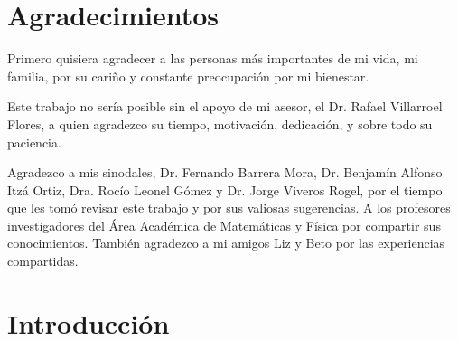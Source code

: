\documentclass[12pt]{book}
\theoremstyle{definition}
\newcounter{in}
\begin{document}

\chapter*{Agradecimientos}

Primero quisiera agradecer a las personas más importantes de mi vida,
mi familia, por su cariño y constante preocupación por mi bienestar.

Este trabajo no sería posible sin el apoyo de mi asesor, el
Dr. Rafael Villarroel Flores, a quien agradezco su
tiempo, motivación, dedicación, y sobre todo su paciencia.

Agradezco a mis sinodales, Dr. Fernando Barrera Mora, Dr. Benjamín
Alfonso Itzá Ortiz, Dra. Rocío Leonel Gómez y Dr. Jorge Viveros Rogel,
por el tiempo que les tomó revisar este trabajo y por sus valiosas
sugerencias. A los profesores investigadores del Área Académica de
Matemáticas y Física por compartir sus conocimientos. También
agradezco a mi amigos Liz y Beto por las experiencias compartidas.

\tableofcontents

\newpage \thispagestyle{empty}

\chapter*{Introducción}
\end{document}
